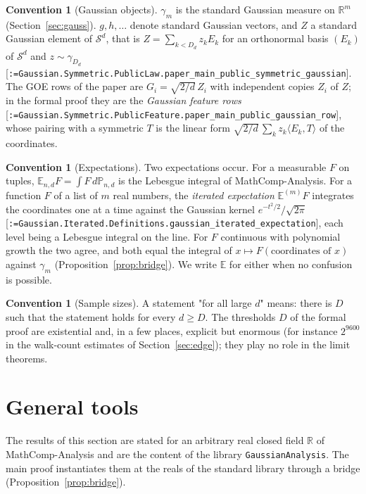 \documentclass[11pt]{article}
\makeatletter
\newcommand{\formal@break}[1]{\@tfor\formal@tok:=#1\do{%
  \formal@tok
  \expandafter\ifx\formal@tok.\allowbreak\else
  \expandafter\ifx\formal@tok\_\allowbreak\fi\fi}}
\DeclareRobustCommand{\formal}[1]{\textnormal{[\texttt{\small\formal@break{#1}}]}}
\newcommand{\R}{\mathbb{R}}
\newcommand{\E}{\mathbb{E}}
\newcommand{\Prob}{\mathbb{P}}
\newcommand{\Sym}{\mathcal{S}}
\newcommand{\ip}[2]{\langle #1, #2\rangle}
\newcommand{\gauss}{\gamma}
\newcommand{\Dd}{D}
\theoremstyle{plain}
\theoremstyle{definition}
\newtheorem{convention}[theorem]{Convention}
\makeatother
\begin{document}
\begin{convention}[Gaussian objects]
$\gauss_m$ is the standard Gaussian measure on $\R^m$ (Section~\ref{sec:gauss}).
$g, h, \ldots$ denote standard Gaussian vectors, and $Z$ a standard
Gaussian element of $\Sym^d$, that is $Z = \sum_{k < \Dd_d} z_k E_k$ for an
orthonormal basis $(E_k)$ of $\Sym^d$ and $z \sim \gauss_{\Dd_d}$
\formal{Gaussian.Symmetric.PublicLaw.paper\_main\_public\_symmetric\_gaussian}.
The GOE rows of the paper are $G_i = \sqrt{2/d}\, Z_i$ with independent
copies $Z_i$ of $Z$; in the formal proof they are the \emph{Gaussian
feature rows} \formal{Gaussian.Symmetric.PublicFeature.paper\_main\_public\_gaussian\_row},
whose pairing with a symmetric $T$ is the linear form
$\sqrt{2/d}\, \sum_k z_k \ip{E_k}{T}$ of the coordinates.
\end{convention}

\begin{convention}[Expectations]
Two expectations occur. For a measurable $F$ on tuples,
$\E_{n,d} F = \int F\, d\Prob_{n,d}$ is the Lebesgue integral of
MathComp-Analysis. For a function $F$ of a list of $m$ real numbers, the
\emph{iterated expectation} $\E^{(m)} F$ integrates the coordinates one at
a time against the Gaussian kernel $e^{-t^2/2}/\sqrt{2\pi}$
\formal{Gaussian.Iterated.Definitions.gaussian\_iterated\_expectation},
each level being a Lebesgue integral on the line. For $F$ continuous with
polynomial growth the two agree, and both equal the integral of
$x \mapsto F(\text{coordinates of } x)$ against $\gauss_m$
(Proposition~\ref{prop:bridge}). We write $\E$ for either when no
confusion is possible.
\end{convention}

\begin{convention}[Sample sizes]
A statement "for all large $d$" means: there is $D$ such that the statement
holds for every $d \ge D$. The thresholds $D$ of the formal proof are
existential and, in a few places, explicit but enormous
(for instance $2^{9600}$ in the walk-count estimates of
Section~\ref{sec:edge}); they play no role in the limit theorems.
\end{convention}

\section{General tools}\label{sec:tools}

The results of this section are stated for an arbitrary real closed field
$\R$ of MathComp-Analysis and are the content of the library
\texttt{GaussianAnalysis}. The main proof instantiates them at the reals of
the standard library through a bridge (Proposition~\ref{prop:bridge}).
\end{document}
